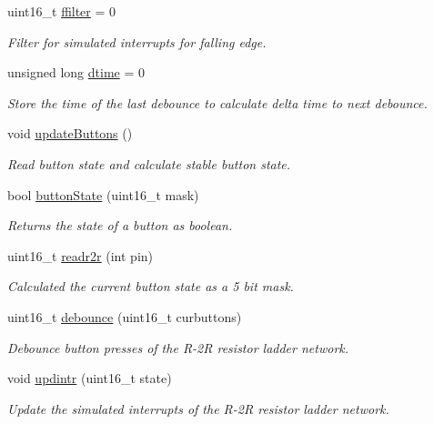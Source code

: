 \begin{DoxyCompactItemize}
uint16\+\_\+t \hyperlink{group__buttons_gaaa75cede053f94cf46d7420556af1505}{ffilter} = 0
\begin{DoxyCompactList}\small\item\em Filter for simulated interrupts for falling edge. \end{DoxyCompactList}\item 
unsigned long \hyperlink{group__buttons_ga94921f7ca95d518d3deabb1da432c2fb}{dtime} = 0
\begin{DoxyCompactList}\small\item\em Store the time of the last debounce to calculate delta time to next debounce. \end{DoxyCompactList}\item 
void \hyperlink{group__buttons_gaf32fa88edc93b34e25f058e331ea1134}{update\+Buttons} ()
\begin{DoxyCompactList}\small\item\em Read button state and calculate stable button state. \end{DoxyCompactList}\item 
bool \hyperlink{group__buttons_gad4a8f6035320735a6ed69364c0f29d63}{button\+State} (uint16\+\_\+t mask)
\begin{DoxyCompactList}\small\item\em Returns the state of a button as boolean. \end{DoxyCompactList}\item 
uint16\+\_\+t \hyperlink{group__buttons_ga5421761bb5d1c3470d3b17196a438c80}{readr2r} (int pin)
\begin{DoxyCompactList}\small\item\em Calculated the current button state as a 5 bit mask. \end{DoxyCompactList}\item 
uint16\+\_\+t \hyperlink{group__buttons_ga0ce7c5a698df341a0f3882378518f562}{debounce} (uint16\+\_\+t curbuttons)
\begin{DoxyCompactList}\small\item\em Debounce button presses of the R-\/2R resistor ladder network. \end{DoxyCompactList}\item 
void \hyperlink{group__buttons_ga66c6a02c014dc9acd3af0c816a70fad8}{updintr} (uint16\+\_\+t state)
\begin{DoxyCompactList}\small\item\em Update the simulated interrupts of the R-\/2R resistor ladder network. \end{DoxyCompactList}\item 

\end{DoxyCompactItemize}
